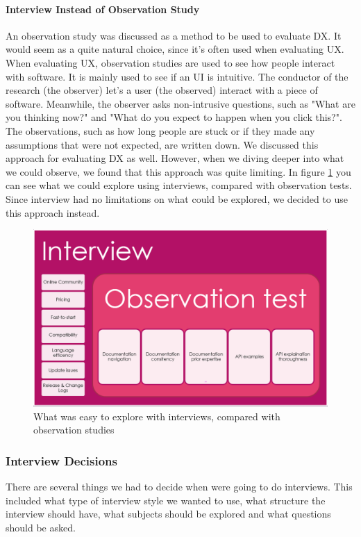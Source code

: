 \documentclass{article}
\begin{document}
\paragraph{Interview Instead of Observation Study}
An observation study was discussed as a method to be used to evaluate DX. It would seem as a quite natural choice, since it's often used when evaluating UX. When evaluating UX, observation studies are used to see how people interact with software. It is mainly used to see if an UI is intuitive. The conductor of the research (the observer) let's a user (the observed) interact with a piece of software. Meanwhile, the observer asks non-intrusive questions, such as "What are you thinking now?" and "What do you expect to happen when you click this?". The observations, such as how long people are stuck or if they made any assumptions that were not expected, are written down. We discussed this approach for evaluating DX as well. However, when we diving deeper into what we could observe, we found that this approach was quite limiting. In figure \ref{fig:obsVSinter} you can see what we could explore using interviews, compared with observation tests. Since interview had no limitations on what could be explored, we decided to use this approach instead.
\begin{figure}[H]
\centering
\includegraphics[width=\linewidth]{obsVSinterview.png}
\caption{What was easy to explore with interviews, compared with observation studies}
\label{fig:obsVSinter}
\end{figure}
\subsubsection{Interview Decisions}
There are several things we had to decide when were going to do interviews. This included what type of interview style we wanted to use, what structure the interview should have, what subjects should be explored and what questions should be asked.
\end{document}
